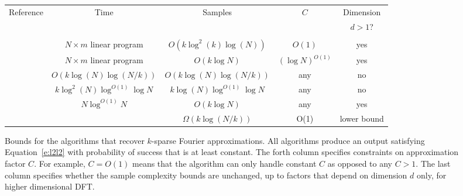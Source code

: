  \begin{figure}[h]
\begin{center}
\begin{tabular}{|c|c|c|c|c|}
\hline
Reference & Time & Samples & $C$  & Dimension\\
&  & & &  $d>1$?\\
\hline\hline
 \cite{CTao,RV, CGV}&  &  & &\\
 \cite{Bourgain2014, HR16}  & $N \times m$ linear program & $O(k \log^2(k) \log(N))$ & $O(1)$ &yes\\
\cite{CP} & $N \times m$ linear program & $O(k \log N)$ & $(\log N)^{O(1)}$ &yes\\
\cite{HIKP2} & $O(k \log(N) \log(N/k))$ & $O(k \log(N) \log(N/k))$   &   any &no \\
\cite{IKP} &  $k \log^2(N)  \log^{O(1)} \log N$ & $k \log(N) \log^{O(1)} \log N$ & any &no\\
\cite{IK14a} & $N \log^{O(1)} N$ & $O(k \log N)$ & any & yes\\
\hline
\cite{DIPW} & & $\Omega(k \log(N/k))$ & O(1) & lower bound\\
\hline
\end{tabular}
\end{center}
\caption{Bounds for the algorithms that recover $k$-sparse Fourier approximations. All algorithms produce an output satisfying Equation~\ref{e:l2l2} with probability of success that is at least constant. The forth column specifies constraints on approximation factor $C$. For example, $C=O(1)$ means that the algorithm can only handle constant $C$ as opposed to any $C>1$. The last column specifies whether the sample complexity bounds are unchanged, up to factors that depend on dimension $d$ only, for higher dimensional DFT.}\label{fig:1}
\end{figure}


